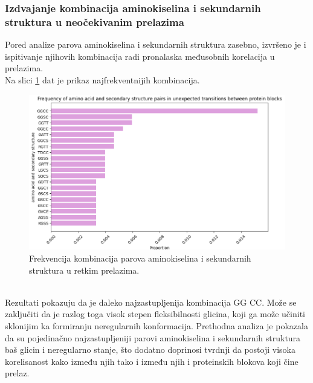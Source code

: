 \documentclass[a4paper,12pt]{article}
\begin{document}
\subsubsection{Izdvajanje kombinacija aminokiselina i sekundarnih struktura u neočekivanim prelazima}
Pored analize parova aminokiselina i sekundarnih struktura zasebno, izvršeno je i ispitivanje njihovih kombinacija radi pronalaska međusobnih korelacija u prelazima.  \\
Na slici \ref{Slika:aas2freq} dat je prikaz najfrekventnijih kombinacija.
\begin{figure}[htbp]
    \centering
    \includegraphics[width=1\textwidth]{./images/aas2freq.png}
    \caption{Frekvencija kombinacija parova aminokiselina i sekundarnih struktura u retkim prelazima.}
    \label{Slika:aas2freq}
\end{figure}
\\
Rezultati pokazuju da je daleko najzastupljenija kombinacija GG CC. Može se zaključiti da je razlog toga visok stepen fleksibilnosti glicina, koji ga može učiniti sklonijim ka formiranju neregularnih konformacija. Prethodna analiza je pokazala da su pojedinačno najzastupljeniji parovi aminokiselina i sekundarnih struktura baš glicin i neregularno stanje, što dodatno doprinosi tvrdnji da postoji visoka korelisanost kako između njih tako i između njih i proteinskih blokova koji čine prelaz.
\end{document}
